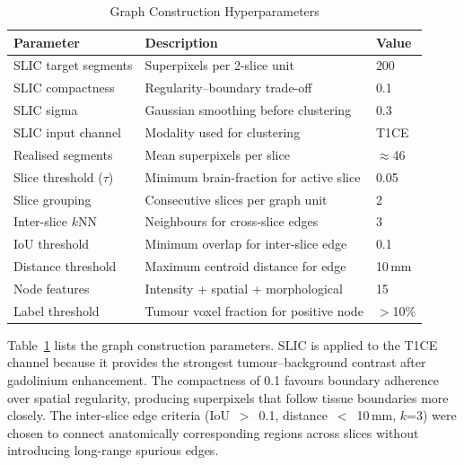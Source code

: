 \documentclass{article}
\begin{document}
\begin{table}[htbp]
\caption{Graph Construction Hyperparameters}
\label{tab:graphparams}
\begin{center}
\begin{tabularx}{0.85\textwidth}{|l|X|l|}
\hline
\textbf{Parameter} & \textbf{Description} & \textbf{Value} \\
\hline
SLIC target segments & Superpixels per 2-slice unit & 200 \\
\hline
SLIC compactness & Regularity--boundary trade-off & 0.1 \\
\hline
SLIC sigma & Gaussian smoothing before clustering & 0.3 \\
\hline
SLIC input channel & Modality used for clustering & T1CE \\
\hline
Realised segments & Mean superpixels per slice & $\approx$46 \\
\hline
Slice threshold ($\tau$) & Minimum brain-fraction for active slice & 0.05 \\
\hline
Slice grouping & Consecutive slices per graph unit & 2 \\
\hline
Inter-slice $k$NN & Neighbours for cross-slice edges & 3 \\
\hline
IoU threshold & Minimum overlap for inter-slice edge & 0.1 \\
\hline
Distance threshold & Maximum centroid distance for edge & 10\,mm \\
\hline
Node features & Intensity + spatial + morphological & 15 \\
\hline
Label threshold & Tumour voxel fraction for positive node & $>$10\% \\
\hline
\end{tabularx}
\end{center}
\end{table}

Table~\ref{tab:graphparams} lists the graph construction parameters. SLIC is
applied to the T1CE channel because it provides the strongest tumour--background
contrast after gadolinium enhancement. The compactness of 0.1 favours boundary
adherence over spatial regularity, producing superpixels that follow tissue
boundaries more closely. The inter-slice edge criteria (IoU~$>$~0.1,
distance~$<$~10\,mm, $k$=3) were chosen to connect anatomically corresponding
regions across slices without introducing long-range spurious edges.
\end{document}
